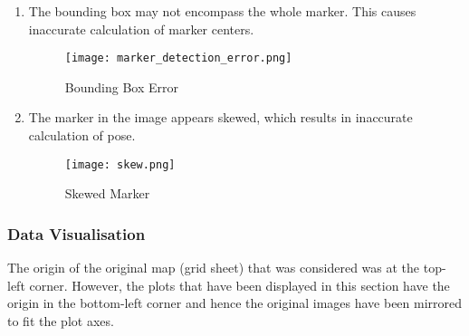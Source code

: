 \documentclass[10pt,a4paper]{article}
\begin{document}
\begin{enumerate}
\begin{enumerate}
		\item
		The bounding box may not encompass the whole marker. This causes inaccurate calculation of marker centers.
		
		\vspace{0.5cm}
		
		\begin{figure}[H]
			\centering
			\texttt{[image: marker\_detection\_error.png]}
			\caption{Bounding Box Error}
		\end{figure}
		
		\item
		The marker in the image appears skewed, which results in inaccurate calculation of pose.
		
		\begin{figure}[H]
			\centering
			\texttt{[image: skew.png]}
			\caption{Skewed Marker}
		\end{figure}
		
		
	\end{enumerate}
	
	
\end{enumerate}


\newpage
\subsubsection{Data Visualisation}

The origin of the original map (grid sheet) that was considered was at the top-left corner. However, the plots that have been displayed in this section have the origin in the bottom-left corner and hence the original images have been mirrored to fit the plot axes.
\end{document}

